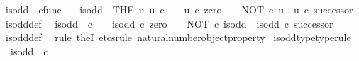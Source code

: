 \begin{isabellebody}
\endisatagproof
{\isafoldproof}%
%
\isadelimproof
%
\endisadelimproof
%
\isadelimdocument
%
\endisadelimdocument
%
\isatagdocument
%
\isamarkuptrue%
%
\endisatagdocument
{\isafolddocument}%
%
\isadelimdocument
%
\endisadelimdocument
{}\isamarkupfalse%
\ is{\isacharunderscore}{\kern0pt}odd\ {\isacharcolon}{\kern0pt}{\isacharcolon}{\kern0pt}\ {\isachardoublequoteopen}cfunc{\isachardoublequoteclose}\ \isanewline
\ \ {\isachardoublequoteopen}is{\isacharunderscore}{\kern0pt}odd\ {\isacharequal}{\kern0pt}\ {\isacharparenleft}{\kern0pt}THE\ u{\isachardot}{\kern0pt}\ u{\isacharcolon}{\kern0pt}\ {\isasymnat}\isactrlsub c\ {\isasymrightarrow}\ {\isasymOmega}\ {\isasymand}\ u\ {\isasymcirc}\isactrlsub c\ zero\ {\isacharequal}{\kern0pt}\ {\isasymf}\ {\isasymand}\ NOT\ {\isasymcirc}\isactrlsub c\ u\ {\isacharequal}{\kern0pt}\ u\ {\isasymcirc}\isactrlsub c\ successor{\isacharparenright}{\kern0pt}{\isachardoublequoteclose}\isanewline
\isanewline
{}\isamarkupfalse%
\ is{\isacharunderscore}{\kern0pt}odd{\isacharunderscore}{\kern0pt}def{}{\isacharcolon}{\kern0pt}\isanewline
\ \ {\isachardoublequoteopen}is{\isacharunderscore}{\kern0pt}odd\ {\isacharcolon}{\kern0pt}\ {\isasymnat}\isactrlsub c\ {\isasymrightarrow}\ {\isasymOmega}\ {\isasymand}\ is{\isacharunderscore}{\kern0pt}odd\ {\isasymcirc}\isactrlsub c\ zero\ {\isacharequal}{\kern0pt}\ {\isasymf}\ {\isasymand}\ NOT\ {\isasymcirc}\isactrlsub c\ is{\isacharunderscore}{\kern0pt}odd\ {\isacharequal}{\kern0pt}\ is{\isacharunderscore}{\kern0pt}odd\ {\isasymcirc}\isactrlsub c\ successor{\isachardoublequoteclose}\isanewline
%
\isadelimproof
\ \ %
\endisadelimproof
%
\isatagproof
{}\isamarkupfalse%
\ is{\isacharunderscore}{\kern0pt}odd{\isacharunderscore}{\kern0pt}def\ \isamarkupfalse%
\ {\isacharparenleft}{\kern0pt}rule\ theI{\isacharprime}{\kern0pt}{\isacharcomma}{\kern0pt}\ etcs{\isacharunderscore}{\kern0pt}rule\ natural{\isacharunderscore}{\kern0pt}number{\isacharunderscore}{\kern0pt}object{\isacharunderscore}{\kern0pt}property{}{\isacharparenright}{\kern0pt}%
\endisatagproof
{\isafoldproof}%
%
\isadelimproof
\isanewline
%
\endisadelimproof
\isanewline
{}\isamarkupfalse%
\ is{\isacharunderscore}{\kern0pt}odd{\isacharunderscore}{\kern0pt}type{\isacharbrackleft}{\kern0pt}type{\isacharunderscore}{\kern0pt}rule{\isacharbrackright}{\kern0pt}{\isacharcolon}{\kern0pt}\isanewline
\ \ {\isachardoublequoteopen}is{\isacharunderscore}{\kern0pt}odd\ {\isacharcolon}{\kern0pt}\ {\isasymnat}\isactrlsub c\ {\isasymrightarrow}\ {\isasymOmega}{\isachardoublequoteclose}\isanewline

\end{isabellebody}
